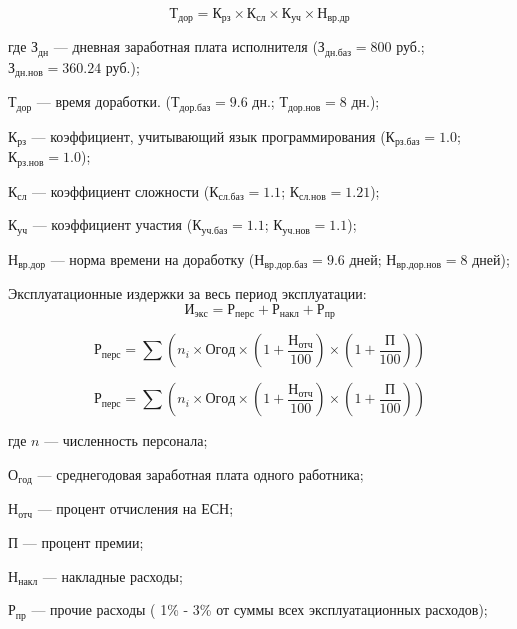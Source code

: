 \begin{equation}
	Т_{дор} = К_{рз} \times{} К_{сл} \times{} К_{уч} \times{} Н_{вр.др}
\end{equation}

\begin{ESKDexplanation}
	\item[где ]{} $З_{дн}$ --- дневная заработная плата исполнителя ($З_{дн.баз} = 800$ руб.; $З_{дн.нов} = 360.24$ руб.);
	\item{} $Т_{дор}$ --- время доработки. ($Т_{дор.баз} = 9.6$ дн.;   $Т_{дор.нов} = 8$ дн.);
	\item{} $К_{рз}$ --- коэффициент, учитывающий язык программирования ($К_{рз.баз} = 1.0$;  $К_{рз.нов} = 1.0$);
	\item{} $К_{сл}$ --- коэффициент сложности ($К_{сл.баз} = 1.1$; $К_{сл.нов} = 1.21$);
	\item{} $К_{уч}$ --- коэффициент участия ($К_{уч.баз} =1.1$; $К_{уч.нов} = 1.1$);
	\item{} $Н_{вр.дор}$ --- норма времени на доработку ($Н_{вр.дор.баз} = 9.6$ дней; $Н_{вр.дор.нов} = 8$ дней);
\end{ESKDexplanation}

Эксплуатационные издержки за весь период эксплуатации:
\begin{equation}
	И_{экс} =  Р_{перс} +  Р_{накл} +  Р_{пр}
\end{equation}

\begin{equation}
	Р_{перс} = \sum{} (n_i \times{} Огод \times{} (1 + \frac{Н_{отч}}{100}) \times{} (1 + \frac{П}{100}))
\end{equation}

\begin{equation}
	Р_{перс} = \sum{}(n_i \times{} Огод \times (1 + \frac{Н_{отч}}{100}) \times{} (1 + \frac{П}{100}))
\end{equation}

\begin{ESKDexplanation}
	\item[где ]{} $n$ --- численность персонала;
	\item{} $О_{год}$ --- среднегодовая заработная плата одного работника;
	\item{} $Н_{отч}$ --- процент отчисления на ЕСН;
	\item{} $П$ --- процент премии;
	\item{} $Н_{накл}$ --- накладные расходы;
	\item{} $Р_{пр}$ --- прочие расходы ( 1\% - 3\%  от суммы всех эксплуатационных расходов);
\end{ESKDexplanation}

